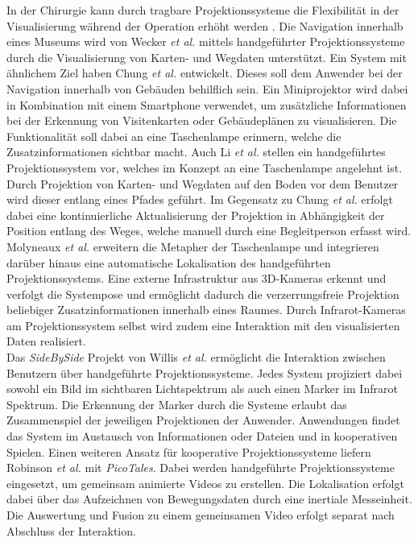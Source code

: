 In der Chirurgie kann durch tragbare Projektionssysteme die Flexibilität in der Visualisierung während der Operation erhöht werden \cite{Kobler2010} \cite{Gavaghan2012}. Die Navigation innerhalb eines Museums wird von Wecker \textit{et al.} \cite{Wecker2013} mittels handgeführter Projektionssysteme durch die Visualisierung von Karten- und Wegdaten unterstützt. Ein System mit ähnlichem Ziel haben Chung \textit{et al.} \cite{Chung2011} entwickelt. Dieses soll dem Anwender bei der Navigation innerhalb von Gebäuden behilflich sein. Ein Miniprojektor wird dabei in Kombination mit einem Smartphone verwendet, um zusätzliche Informationen bei der Erkennung von Visitenkarten oder Gebäudeplänen zu visualisieren. Die Funktionalität soll dabei an eine Taschenlampe erinnern, welche die Zusatzinformationen sichtbar macht. Auch Li \textit{et al.} \cite{Li2013} stellen ein handgeführtes Projektionssystem vor, welches im Konzept an eine Taschenlampe angelehnt ist. Durch Projektion von Karten- und Wegdaten auf den Boden vor dem Benutzer wird dieser entlang eines Pfades geführt. Im Gegensatz zu Chung \textit{et al.} erfolgt dabei eine kontinuierliche Aktualisierung der Projektion in Abhängigkeit der Position entlang des Weges, welche manuell durch eine Begleitperson erfasst wird. Molyneaux \textit{et al.} \cite{Molyneaux2012} erweitern die Metapher der Taschenlampe und integrieren darüber hinaus eine automatische Lokalisation des handgeführten Projektionssystems. Eine externe Infrastruktur aus 3D-Kameras erkennt und verfolgt die Systempose und ermöglicht dadurch die verzerrungsfreie Projektion beliebiger Zusatzinformationen innerhalb eines Raumes. Durch Infrarot-Kameras am Projektionssystem selbst wird zudem eine Interaktion mit den visualisierten Daten realisiert.\\

Das \textit{SideBySide} Projekt von Willis \textit{et al.} \cite{Willis2011} ermöglicht die Interaktion zwischen Benutzern über handgeführte Projektionssysteme. Jedes System projiziert dabei sowohl ein Bild im sichtbaren Lichtspektrum als auch einen Marker im Infrarot Spektrum. Die Erkennung der Marker durch die Systeme erlaubt das Zusammenspiel der jeweiligen Projektionen der Anwender. Anwendungen findet das System im Austausch von Informationen oder Dateien und in kooperativen Spielen. Einen weiteren Ansatz für kooperative Projektionssysteme liefern Robinson \textit{et al.} \cite{Robinson2012} mit \textit{PicoTales}. Dabei werden handgeführte Projektionssysteme eingesetzt, um gemeinsam animierte Videos zu erstellen. Die Lokalisation erfolgt dabei über das Aufzeichnen von Bewegungsdaten durch eine inertiale Messeinheit. Die Auswertung und Fusion zu einem gemeinsamen Video erfolgt separat nach Abschluss der Interaktion.\\

